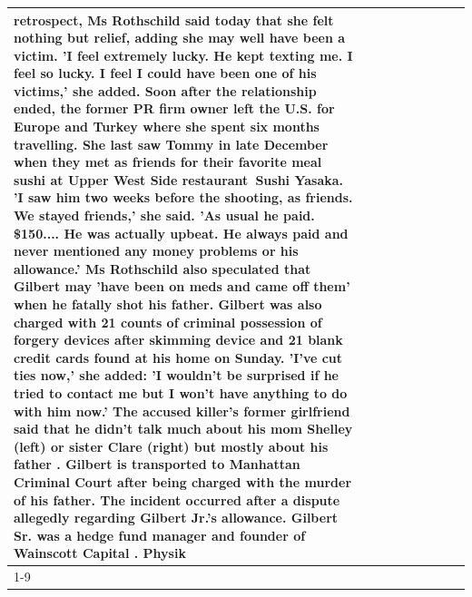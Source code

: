 \begin{table}[H]
\begin{tabular}{lllrlllll}
retrospect, Ms Rothschild said today that she felt nothing but relief, adding she may well have been a victim. 'I feel extremely lucky. He kept texting me. I feel so lucky. I feel I could have been one of his victims,' she added. Soon after the relationship ended, the former PR firm owner left the U.S. for Europe and Turkey where she spent six months  travelling. She last saw Tommy in late December when they met as friends for their favorite meal sushi at Upper West Side restaurant Sushi Yasaka. 'I saw him two weeks before the shooting, as friends. We stayed friends,' she said. 'As usual he paid. \$150.... He was actually upbeat. He always paid and never mentioned any money problems or his allowance.' Ms Rothschild also speculated that Gilbert may 'have been on meds and came off them' when he fatally shot his father. Gilbert was also charged with 21 counts of criminal possession of forgery devices after skimming device and 21 blank credit cards found at his home on Sunday. 'I've cut ties now,' she added: 'I wouldn’t be surprised if he tried to contact me but I won’t have anything to do with him now.' The accused killer's former girlfriend said that he didn't talk much about his mom Shelley (left) or sister Clare (right) but mostly about his father . Gilbert is transported to Manhattan Criminal Court  after being charged with the murder of his father. The incident occurred after a dispute allegedly regarding Gilbert Jr.'s allowance. Gilbert Sr. was a hedge fund manager and founder of Wainscott Capital . Physik \\
\cline{1-9}

\end{tabular}
\end{table}
